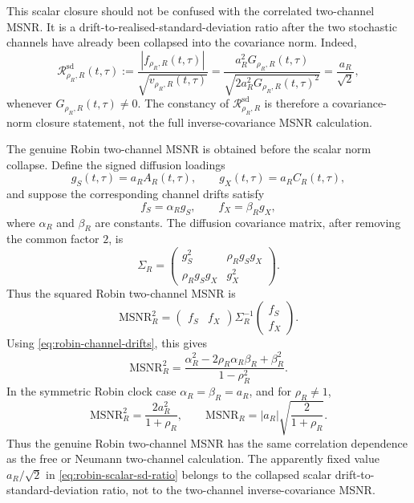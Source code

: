 \documentclass[11pt]{article}
\numberwithin{equation}{section}
\begin{document}
This scalar closure should not be confused with the correlated two-channel MSNR. It is a drift-to-realised-standard-deviation ratio after the two stochastic channels have already been collapsed into the covariance norm. Indeed,
\begin{equation}
\label{eq:robin-scalar-sd-ratio}
\mathcal R_{\rho_R,R}^{\mathrm{sd}}(t,\tau)
:=
\frac{|f_{\rho_R,R}(t,\tau)|}{\sqrt{v_{\rho_R,R}(t,\tau)}}
=
\frac{a_R^2G_{\rho_R,R}(t,\tau)}
{\sqrt{2a_R^2G_{\rho_R,R}(t,\tau)^2}}
=\frac{a_R}{\sqrt{2}},
\end{equation}
whenever \(G_{\rho_R,R}(t,\tau)\neq0\). The constancy of \(\mathcal R_{\rho_R,R}^{\mathrm{sd}}\) is therefore a covariance-norm closure statement, not the full inverse-covariance MSNR calculation.

The genuine Robin two-channel MSNR is obtained before the scalar norm collapse. Define the signed diffusion loadings
\[
g_S(t,\tau)=a_RA_R(t,\tau),
\qquad
g_X(t,\tau)=a_RC_R(t,\tau),
\]
and suppose the corresponding channel drifts satisfy
\begin{equation}
\label{eq:robin-channel-drifts}
f_S=\alpha_R g_S,
\qquad
f_X=\beta_R g_X,
\end{equation}
where \(\alpha_R\) and \(\beta_R\) are constants. The diffusion covariance matrix, after removing the common factor \(2\), is
\[
\Sigma_R
=
\begin{pmatrix}
g_S^2 & \rho_Rg_Sg_X \\
\rho_Rg_Sg_X & g_X^2
\end{pmatrix}.
\]
Thus the squared Robin two-channel MSNR is
\begin{equation}
\label{eq:robin-two-channel-MSNR-form}
\mathrm{MSNR}_{R}^2
=
\begin{pmatrix} f_S & f_X \end{pmatrix}
\Sigma_R^{-1}
\begin{pmatrix} f_S \\ f_X \end{pmatrix}.
\end{equation}
Using \eqref{eq:robin-channel-drifts}, this gives
\begin{equation}
\label{eq:robin-two-channel-MSNR}
\boxed{
\mathrm{MSNR}_{R}^2
=
\frac{
\alpha_R^2-2\rho_R\alpha_R\beta_R+\beta_R^2
}{
1-\rho_R^2
}.
}
\end{equation}
In the symmetric Robin clock case \(\alpha_R=\beta_R=a_R\), and for \(\rho_R\neq1\),
\begin{equation}
\label{eq:robin-symmetric-MSNR}
\boxed{
\mathrm{MSNR}_{R}^2
=
\frac{2a_R^2}{1+\rho_R},
\qquad
\mathrm{MSNR}_{R}
=
|a_R|\sqrt{\frac{2}{1+\rho_R}}.
}
\end{equation}
Thus the genuine Robin two-channel MSNR has the same correlation dependence as the free or Neumann two-channel calculation. The apparently fixed value \(a_R/\sqrt{2}\) in \eqref{eq:robin-scalar-sd-ratio} belongs to the collapsed scalar drift-to-standard-deviation ratio, not to the two-channel inverse-covariance MSNR.
\end{document}
